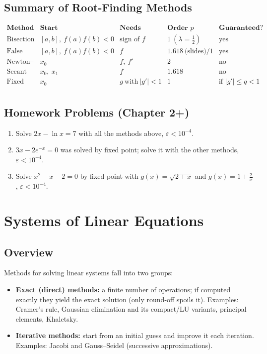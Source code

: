 \documentclass[hidelinks]{article}
\newcommand{\abs}[1]{\left|#1\right|}
\begin{document}
\subsection{Summary of Root-Finding Methods}

\[
\begin{array}{lllll}
\textbf{Method} & \textbf{Start} & \textbf{Needs} & \textbf{Order }p & \textbf{Guaranteed?}\\ \hline
\text{Bisection} & [a,b],\ f(a)f(b)<0 & \text{sign of }f & 1\ (\lambda=\tfrac12) & \text{yes}\\
\text{False position} & [a,b],\ f(a)f(b)<0 & f & 1.618\ \text{(slides)}/1 & \text{yes}\\
\text{Newton--Raphson} & x_0 & f,\ f' & 2 & \text{no}\\
\text{Secant} & x_0,\ x_1 & f & 1.618 & \text{no}\\
\text{Fixed point} & x_0 & g\ \text{with}\ \abs{g'}<1 & 1 & \text{if }\abs{g'}\le q<1\\
\end{array}
\]

\subsection{Homework Problems (Chapter 2+)}

\begin{enumerate}
    \item Solve $2x-\ln x=7$ with all the methods above, $\varepsilon<10^{-4}$.
    \item $3x-2e^{-x}=0$ was solved by fixed point; solve it with the other methods, $\varepsilon<10^{-4}$.
    \item Solve $x^2-x-2=0$ by fixed point with $g(x)=\sqrt{2+x}$ and $g(x)=1+\frac2x$, $\varepsilon<10^{-4}$.
\end{enumerate}
\section{Systems of Linear Equations}\label{sec:linear}

\subsection{Overview}

Methods for solving linear systems fall into two groups:
\begin{itemize}
    \item \textbf{Exact (direct) methods:} a finite number of operations; if computed exactly they yield the exact solution (only round-off spoils it). Examples: Cramer's rule, Gaussian elimination and its compact/LU variants, principal elements, Khaletsky.
    \item \textbf{Iterative methods:} start from an initial guess and improve it each iteration. Examples: Jacobi and Gauss--Seidel (successive approximations).
\end{itemize}
\end{document}
